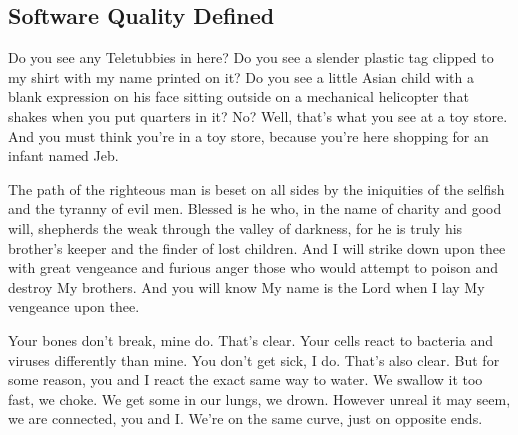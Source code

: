 \subsection{Software Quality Defined}

Do you see any Teletubbies in here? Do you see a slender plastic tag clipped to my shirt with my name printed on it? Do you see a little Asian child with a blank expression on his face sitting outside on a mechanical helicopter that shakes when you put quarters in it? No? Well, that's what you see at a toy store. And you must think you're in a toy store, because you're here shopping for an infant named Jeb.

The path of the righteous man is beset on all sides by the iniquities of the selfish and the tyranny of evil men. Blessed is he who, in the name of charity and good will, shepherds the weak through the valley of darkness, for he is truly his brother's keeper and the finder of lost children. And I will strike down upon thee with great vengeance and furious anger those who would attempt to poison and destroy My brothers. And you will know My name is the Lord when I lay My vengeance upon thee.

Your bones don't break, mine do. That's clear. Your cells react to bacteria and viruses differently than mine. You don't get sick, I do. That's also clear. But for some reason, you and I react the exact same way to water. We swallow it too fast, we choke. We get some in our lungs, we drown. However unreal it may seem, we are connected, you and I. We're on the same curve, just on opposite ends.

 
 
